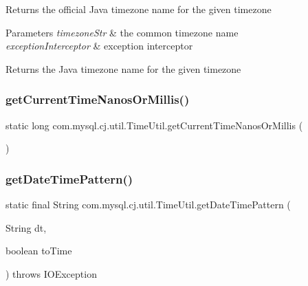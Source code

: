 Returns the \textquotesingle{}official\textquotesingle{} Java timezone name for the given timezone


\begin{DoxyParams}{Parameters}
{\em timezone\+Str} & the \textquotesingle{}common\textquotesingle{} timezone name \\
\hline
{\em exception\+Interceptor} & exception interceptor\\
\hline
\end{DoxyParams}
\begin{DoxyReturn}{Returns}
the Java timezone name for the given timezone 
\end{DoxyReturn}
\mbox{\label{classcom_1_1mysql_1_1cj_1_1util_1_1_time_util_a224da639d5b047ba110cc88396c793f4}} 
\subsubsection{\texorpdfstring{get\+Current\+Time\+Nanos\+Or\+Millis()}{getCurrentTimeNanosOrMillis()}}
{\footnotesize\ttfamily static long com.\+mysql.\+cj.\+util.\+Time\+Util.\+get\+Current\+Time\+Nanos\+Or\+Millis (\begin{DoxyParamCaption}{ }\end{DoxyParamCaption})\hspace{0.3cm}{\ttfamily [static]}}

\mbox{\label{classcom_1_1mysql_1_1cj_1_1util_1_1_time_util_a1da7f3d2dfbeaf21b375380c2d90b36a}} 
\subsubsection{\texorpdfstring{get\+Date\+Time\+Pattern()}{getDateTimePattern()}}
{\footnotesize\ttfamily static final String com.\+mysql.\+cj.\+util.\+Time\+Util.\+get\+Date\+Time\+Pattern (\begin{DoxyParamCaption}\item[{String}]{dt,  }\item[{boolean}]{to\+Time }\end{DoxyParamCaption}) throws I\+O\+Exception\hspace{0.3cm}{\ttfamily [static]}}

